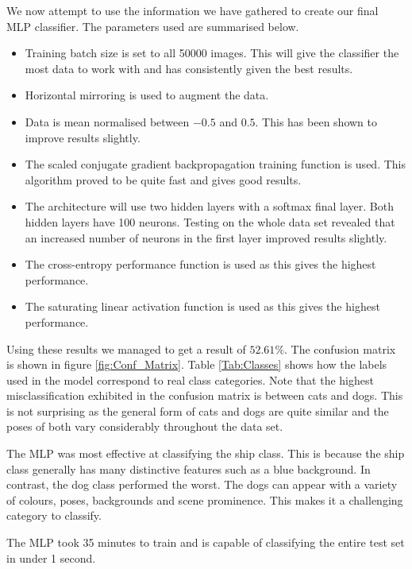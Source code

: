 We now attempt to use the information we have gathered to create our final MLP classifier. The parameters used are summarised below.
\begin{itemize}
    \item Training batch size is set to all 50000 images. This will give the classifier the most data to work with and has consistently given the best results.
    \item Horizontal mirroring is used to augment the data.
    \item Data is mean normalised between $-0.5$ and $0.5$. This has been shown to improve results slightly.
    \item The scaled conjugate gradient backpropagation training function is used. This algorithm proved to be quite fast and gives good results.
    \item The architecture will use two hidden layers with a softmax final layer. Both hidden layers have 100 neurons. Testing on the whole data set revealed that an increased number of neurons in the first layer improved results slightly.
    \item The cross-entropy performance function is used as this gives the highest performance.
    \item The saturating linear activation function is used as this gives the highest performance.
\end{itemize}

Using these results we managed to get a result of $52.61\%$. The confusion matrix is shown in figure \ref{fig:Conf_Matrix}. Table \ref{Tab:Classes} shows how the labels used in the model correspond to real class categories. Note that the highest misclassification exhibited in the confusion matrix is between cats and dogs. This is not surprising as the general form of cats and dogs are quite similar and the poses of both vary considerably throughout the data set.

The MLP was most effective at classifying the ship class. This is because the ship class generally has many distinctive features such as a blue background. In contrast, the dog class performed the worst. The dogs can appear with a variety of colours, poses, backgrounds and scene prominence. This makes it a challenging category to classify.

The MLP took 35 minutes to train and is capable of classifying the entire test set in under 1 second.



